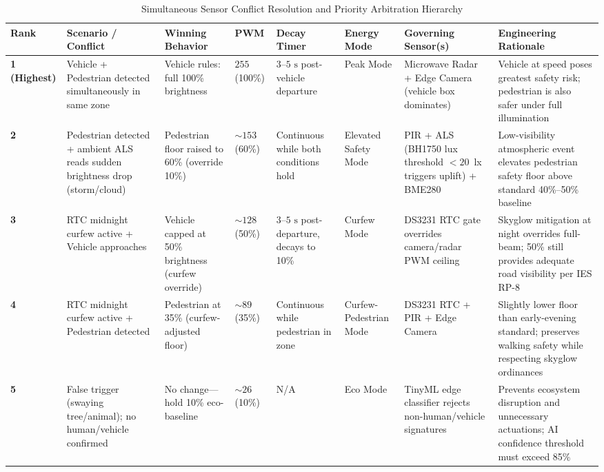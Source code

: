 \documentclass[11pt,a4paper]{article}
\begin{document}
\begin{table}[tbp]
\centering
\caption{Simultaneous Sensor Conflict Resolution and Priority Arbitration Hierarchy}
\label{tab:priority_hierarchy}
\footnotesize
\setlength{\tabcolsep}{2.5pt}
\begin{tabularx}{\textwidth}{>{\centering\arraybackslash}p{1.2cm}>{\raggedright\arraybackslash}p{2.3cm}>{\raggedright\arraybackslash}p{2.1cm}>{\centering\arraybackslash}p{1.3cm}>{\centering\arraybackslash}p{1.5cm}>{\raggedright\arraybackslash}p{1.4cm}>{\raggedright\arraybackslash}X>{\raggedright\arraybackslash}X}
\toprule
\textbf{Rank} & \textbf{Scenario / Conflict} & \textbf{Winning Behavior} & \textbf{PWM} & \textbf{Decay Timer} & \textbf{Energy Mode} & \textbf{Governing Sensor(s)} & \textbf{Engineering Rationale} \\
\midrule
\textbf{1 (Highest)} & Vehicle + Pedestrian detected simultaneously in same zone & Vehicle rules: full 100\% brightness & $255$ (100\%) & \(3\text{--}5\text{ s}\) post-vehicle departure & Peak Mode & Microwave Radar + Edge Camera (vehicle box dominates) & Vehicle at speed poses greatest safety risk; pedestrian is also safer under full illumination \\
\midrule
\textbf{2} & Pedestrian detected + ambient ALS reads sudden brightness drop (storm/cloud) & Pedestrian floor raised to 60\% (override 10\%) & \(\sim 153\) (60\%) & Continuous while both conditions hold & Elevated Safety Mode & PIR + ALS (BH1750 lux threshold \(<20\)~lx triggers uplift) + BME280 & Low-visibility atmospheric event elevates pedestrian safety floor above standard 40\%--50\% baseline \\
\midrule
\textbf{3} & RTC midnight curfew active + Vehicle approaches & Vehicle capped at 50\% brightness (curfew override) & \(\sim 128\) (50\%) & \(3\text{--}5\text{ s}\) post-departure, decays to 10\% & Curfew Mode & DS3231 RTC gate overrides camera/radar PWM ceiling & Skyglow mitigation at night overrides full-beam; 50\% still provides adequate road visibility per IES RP-8 \cite{ies_rp8} \\
\midrule
\textbf{4} & RTC midnight curfew active + Pedestrian detected & Pedestrian at 35\% (curfew-adjusted floor) & \(\sim 89\) (35\%) & Continuous while pedestrian in zone & Curfew-Pedestrian Mode & DS3231 RTC + PIR + Edge Camera & Slightly lower floor than early-evening standard; preserves walking safety while respecting skyglow ordinances \\
\midrule
\textbf{5} & False trigger (swaying tree/animal); no human/vehicle confirmed & No change---hold 10\% eco-baseline & \(\sim 26\) (10\%) & N/A & Eco Mode & TinyML edge classifier rejects non-human/vehicle signatures & Prevents ecosystem disruption and unnecessary actuations; AI confidence threshold must exceed 85\% \\

\end{tabularx}
\end{table}
\end{document}
